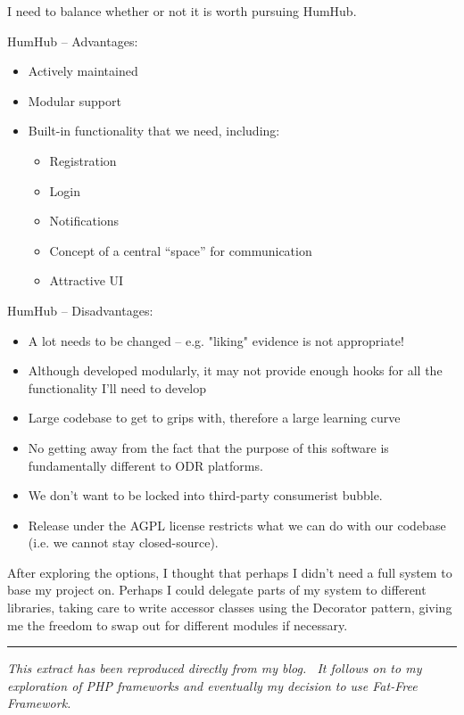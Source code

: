 I need to balance whether or not it is worth pursuing HumHub.

HumHub – Advantages:

\begin{itemize}
    \item Actively maintained
    \item Modular support
    \item Built-in functionality that we need, including:
    \begin{itemize}
        \item Registration
        \item Login
        \item Notifications
        \item Concept of a central “space” for communication
        \item Attractive UI
    \end{itemize}
\end{itemize}


HumHub – Disadvantages:

\begin{itemize}
    \item A lot needs to be changed – e.g. "liking" evidence is not appropriate!
    \item Although developed modularly, it may not provide enough hooks for all the functionality I'll need to develop
    \item Large codebase to get to grips with, therefore a large learning curve
    \item No getting away from the fact that the purpose of this software is fundamentally different to ODR platforms.
    \item We don't want to be locked into third-party consumerist bubble.
    \item Release under the AGPL license restricts what we can do with our codebase (i.e. we cannot stay closed-source).
\end{itemize}

After exploring the options, I thought that perhaps I didn't need a full system to base my project on. Perhaps I could delegate parts of my system to different libraries, taking care to write accessor classes using the Decorator pattern, giving me the freedom to swap out for different modules if necessary.

\rule{\textwidth}{1pt}

\emph{This extract has been reproduced directly from my blog.~\cite{appendix:choosingAFramework} It follows on to my exploration of PHP frameworks and eventually my decision to use Fat-Free Framework.}